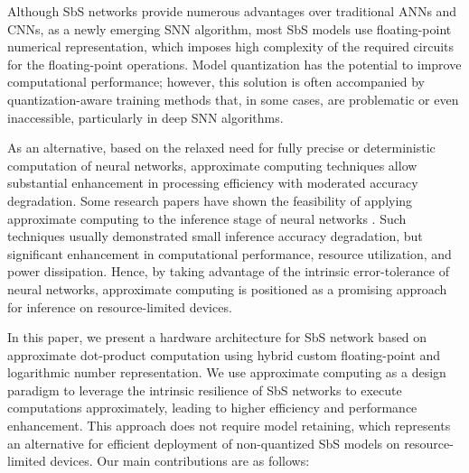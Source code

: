 Although SbS networks provide numerous advantages over traditional ANNs and CNNs, as a newly emerging SNN algorithm, most SbS models use floating-point numerical representation, which imposes high complexity of the required circuits for the floating-point operations. Model quantization has the potential to improve computational performance; however, this solution is often accompanied by quantization-aware training methods that, in some cases, are problematic or even inaccessible, particularly in deep SNN algorithms\cite{zhang2018survey}.

As an alternative, based on the relaxed need for fully precise or deterministic computation of neural networks, approximate computing techniques allow substantial enhancement in processing efficiency with moderated accuracy degradation. Some research papers have shown the feasibility of applying approximate computing to the inference stage of neural networks \cite{lotrivc2012applicability, sarwar2016multiplier, mrazek2016design, du2014leveraging}. Such techniques usually demonstrated small inference accuracy degradation, but significant enhancement in computational performance, resource utilization, and power dissipation. Hence, by taking advantage of the intrinsic error-tolerance of neural networks, approximate computing is positioned as a promising approach for inference on resource-limited devices.

In this paper, we present a hardware architecture for SbS network based on approximate dot-product computation using hybrid custom floating-point and logarithmic number representation. We use approximate computing as a design paradigm to leverage the intrinsic resilience of SbS networks to execute computations approximately, leading to higher efficiency and performance enhancement. This approach does not require model retaining, which represents an alternative for efficient deployment of non-quantized SbS models on resource-limited devices. Our main contributions are as follows:

